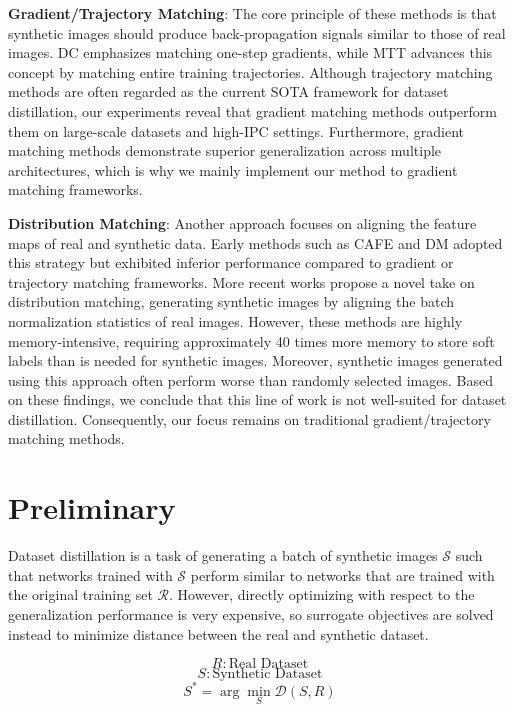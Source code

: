 \documentclass{article}
\theoremstyle{plain}
\theoremstyle{definition}
\theoremstyle{remark}
\begin{document}
\textbf{Gradient/Trajectory Matching}: The core principle of these methods is that synthetic images should produce back-propagation signals similar to those of real images. DC emphasizes matching one-step gradients, while MTT advances this concept by matching entire training trajectories. Although trajectory matching methods are often regarded as the current SOTA framework for dataset distillation, our experiments reveal that gradient matching methods outperform them on large-scale datasets and high-IPC settings. Furthermore, gradient matching methods demonstrate superior generalization across multiple architectures, which is why we mainly implement our method to gradient matching frameworks.

\textbf{Distribution Matching}: Another approach focuses on aligning the feature maps of real and synthetic data. Early methods such as CAFE and DM adopted this strategy but exhibited inferior performance compared to gradient or trajectory matching frameworks. More recent works propose a novel take on distribution matching, generating synthetic images by aligning the batch normalization statistics of real images. However, these methods are highly memory-intensive, requiring approximately 40 times more memory to store soft labels than is needed for synthetic images. Moreover, synthetic images generated using this approach often perform worse than randomly selected images. Based on these findings, we conclude that this line of work is not well-suited for dataset distillation. Consequently, our focus remains on traditional gradient/trajectory matching methods.



\section{Preliminary}

Dataset distillation is a task of generating a batch of synthetic images $\mathcal{S}$ such that networks trained with $\mathcal{S}$ perform similar to networks that are trained with the original training set $\mathcal{R}$. However, directly optimizing with respect to the generalization performance is very expensive, so surrogate objectives are solved instead to minimize distance between the real and synthetic dataset.

\begin{equation}
R: \text{Real Dataset}
\end{equation}
\begin{equation}
S: \text{Synthetic Dataset}
\end{equation}
\begin{equation}
S^* = \arg \min_{S} \mathcal{D}(S,R)
\end{equation}
\end{document}
